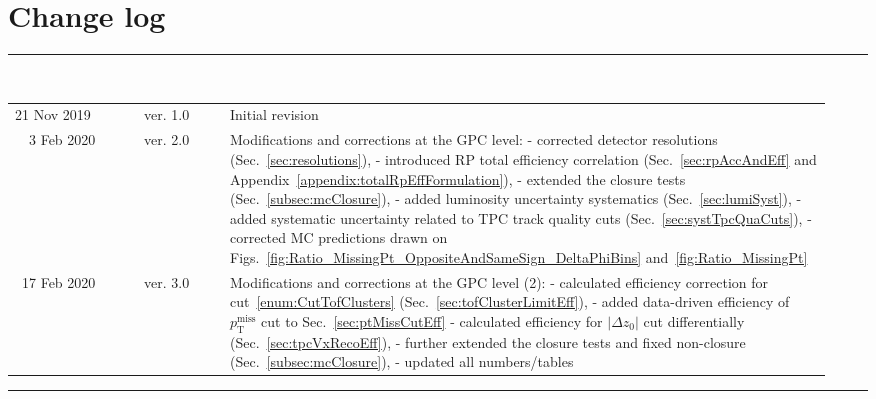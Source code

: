 \section*{\LARGE Change log}%
%
  \rule{\textwidth}{1.0pt}\\[5pt]%
  \begin{tabular}{>{\raggedright}p{0.15\linewidth}p{0.1\linewidth}p{0.7\linewidth}}
  	21 Nov 2019 & ver. 1.0 & Initial revision\\
  	~~3 Feb 2020 & ver. 2.0 & Modifications and corrections at the GPC level:%
  	\newline- corrected detector resolutions (Sec.~\ref{sec:resolutions}),%
  	\newline- introduced RP total efficiency correlation (Sec.~\ref{sec:rpAccAndEff} and Appendix~\ref{appendix:totalRpEffFormulation}),%
  	\newline- extended the closure tests (Sec.~\ref{subsec:mcClosure}),%
  	\newline- added luminosity uncertainty systematics (Sec.~\ref{sec:lumiSyst}),%
  	\newline- added systematic uncertainty related to TPC track quality cuts (Sec.~\ref{sec:systTpcQuaCuts}),%
  	\newline- corrected MC predictions drawn on Figs.~\ref{fig:Ratio_MissingPt_OppositeAndSameSign_DeltaPhiBins} and~\ref{fig:Ratio_MissingPt}\\
  	~17 Feb 2020 & ver. 3.0 & Modifications and corrections at the GPC level (2):%
  	\newline- calculated efficiency correction for cut~\ref{enum:CutTofClusters} (Sec.~\ref{sec:tofClusterLimitEff}),%
  	\newline- added data-driven efficiency of $p_{\text{T}}^{\text{miss}}$ cut to Sec.~\ref{sec:ptMissCutEff}
  	\newline- calculated efficiency for $|\Delta z_{0}|$ cut differentially (Sec.~\ref{sec:tpcVxRecoEff}),%
  	\newline- further extended the closure tests and fixed non-closure (Sec.~\ref{subsec:mcClosure}),%
  	\newline- updated all numbers/tables
  \end{tabular}\newline%
 \rule{\textwidth}{1.0pt}
